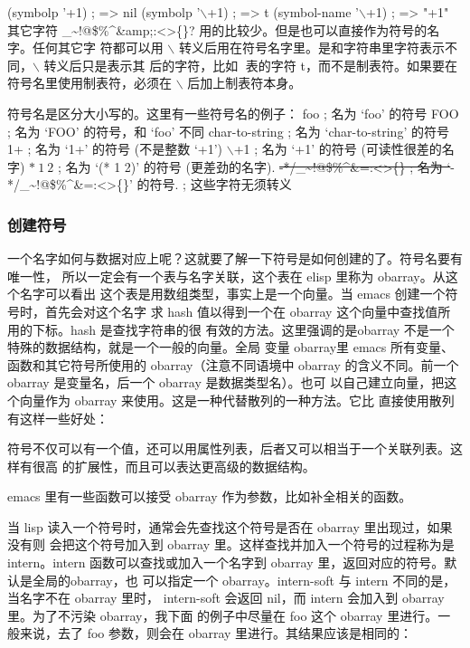 \documentclass[11pt]{ctexart}
\begin{document}
(symbolp '+1)                           ; => nil
(symbolp '$\backslash$+1)                          ; => t
(symbol-name '$\backslash$+1)                      ; => "+1"
其它字符 \_\textasciitilde{}!@\$\%\^{}\&amp;:<>\{\}? 用的比较少。但是也可以直接作为符号的名字。任何其它字
符都可以用 $\backslash$ 转义后用在符号名字里。是和字符串里字符表示不同，$\backslash$ 转义后只是表示其
后的字符，比如 \t 代表的字符 t，而不是制表符。如果要在符号名里使用制表符，必须在
$\backslash$ 后加上制表符本身。

符号名是区分大小写的。这里有一些符号名的例子：
foo                 ; 名为 `foo' 的符号
FOO                 ; 名为 `FOO' 的符号，和 `foo' 不同
char-to-string      ; 名为 `char-to-string' 的符号
1+                  ; 名为 `1+' 的符号 (不是整数 `+1')
$\backslash$+1                 ; 名为 `+1' 的符号 (可读性很差的名字)
\(*\ 1\ 2\)         ; 名为 `(* 1 2)' 的符号 (更差劲的名字).
\sout{-*/\_\textasciitilde{}!@\$\%\^{}\&=:<>\{\}  ; 名为 `}-*/\_\textasciitilde{}!@\$\%\^{}\&=:<>\{\}' 的符号.
;   这些字符无须转义
\subsubsection{创建符号}
\label{sec:orgd98c0d1}

一个名字如何与数据对应上呢？这就要了解一下符号是如何创建的了。符号名要有唯一性，
所以一定会有一个表与名字关联，这个表在 elisp 里称为 obarray。从这个名字可以看出
这个表是用数组类型，事实上是一个向量。当 emacs 创建一个符号时，首先会对这个名字
求 hash 值以得到一个在 obarray 这个向量中查找值所用的下标。hash 是查找字符串的很
有效的方法。这里强调的是obarray 不是一个特殊的数据结构，就是一个一般的向量。全局
变量 obarray里 emacs 所有变量、函数和其它符号所使用的 obarray（注意不同语境中
obarray 的含义不同。前一个 obarray 是变量名，后一个 obarray 是数据类型名）。也可
以自己建立向量，把这个向量作为 obarray 来使用。这是一种代替散列的一种方法。它比
直接使用散列有这样一些好处：

符号不仅可以有一个值，还可以用属性列表，后者又可以相当于一个关联列表。这样有很高
的扩展性，而且可以表达更高级的数据结构。

emacs 里有一些函数可以接受 obarray 作为参数，比如补全相关的函数。

当 lisp 读入一个符号时，通常会先查找这个符号是否在 obarray 里出现过，如果没有则
会把这个符号加入到 obarray 里。这样查找并加入一个符号的过程称为是 intern。intern
函数可以查找或加入一个名字到 obarray 里，返回对应的符号。默认是全局的obarray，也
可以指定一个 obarray。intern-soft 与 intern 不同的是，当名字不在 obarray 里时，
intern-soft 会返回 nil，而 intern 会加入到 obarray里。为了不污染 obarray，我下面
的例子中尽量在 foo 这个 obarray 里进行。一般来说，去了 foo 参数，则会在 obarray
里进行。其结果应该是相同的：
\end{document}
